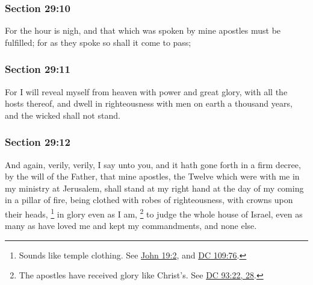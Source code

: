 	\subsubsection{Section 29:10} %
		\label{DC29-10}

		For the hour is nigh, and that which was spoken by mine apostles must be fulfilled; for as they spoke so shall it come to pass;


	\subsubsection{Section 29:11} %
		\label{DC29-11}

		For I will reveal myself from heaven with power and great glory, with all the hosts thereof, and dwell in righteousness with men on earth a thousand years, and the wicked shall not stand.


	\subsubsection{Section 29:12} %
		\label{DC29-12}

		And again, verily, verily, I say unto you, and it hath gone forth in a firm decree, by the will of the Father, that mine apostles, the Twelve which were with me in my ministry at Jerusalem, shall stand at my right hand at the day of my coming in a pillar of fire, being clothed with robes of righteousness, with crowns upon their heads,%
			\footnote{%
				Sounds like temple clothing. See \hyperref[JOHN-19-2]{John 19:2}, and \hyperref[DC109-76]{DC 109:76}.
				}
		in glory even as I am,%
			\footnote{%
				The apostles have received glory like Christ's. See \hyperref[DC93-22]{DC 93:22, 28}.
				}
		to judge the whole house of Israel, even as many as have loved me and kept my commandments, and none else.

